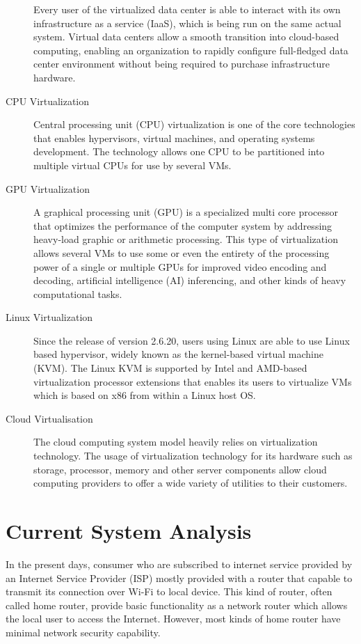 \documentclass[../index.tex]{subfiles}
\begin{document}
\begin{description}
    Every user of the virtualized data center is able to interact with its own infrastructure as a
    service (IaaS), which is being run on the same actual system. Virtual data centers allow a
    smooth transition into cloud-based computing, enabling an organization to rapidly configure
    full-fledged data center environment without being required to purchase infrastructure hardware.

  \item[CPU Virtualization] Central processing unit (CPU) virtualization is one of the core
    technologies that enables hypervisors, virtual machines, and operating systems development. The
    technology allows one CPU to be partitioned into multiple virtual CPUs for use by several VMs.

  \item[GPU Virtualization] A graphical processing unit (GPU) is a specialized multi core processor
    that optimizes the performance of the computer system by addressing heavy-load graphic or
    arithmetic processing. This type of virtualization allows several VMs to use some or even the
    entirety of the processing power of a single or multiple GPUs for improved video encoding and
    decoding, artificial intelligence (AI) inferencing, and other kinds of heavy computational
    tasks.

  \item[Linux Virtualization] Since the release of version 2.6.20, users using Linux are able to use
    Linux based hypervisor, widely known as the kernel-based virtual machine (KVM). The Linux KVM is
    supported by Intel and AMD-based virtualization processor extensions that enables its users to
    virtualize VMs which is based on x86 from within a Linux host OS.

  \item[Cloud Virtualisation] The cloud computing system model heavily relies on virtualization
    technology. The usage of virtualization technology for its hardware such as storage, processor,
    memory and other server components allow cloud computing providers to offer a wide variety of
    utilities to their customers.

\end{description}

\section{Current System Analysis}

In the present days, consumer who are subscribed to internet service provided by an Internet Service
Provider (ISP) mostly provided with a router that capable to transmit its connection over Wi-Fi to
local device. This kind of router, often called home router, provide basic functionality as a
network router which allows the local user to access the Internet. However, most kinds of home
router have minimal network security capability.
\end{document}
